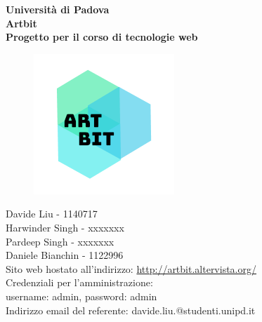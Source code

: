 \documentclass[openany, a4paper, 12pt]{report}
\begin{document}
	\begin{titlepage}
		\centering
		\vfill
		{
			\bfseries
			\vskip2cm
			\Large Università di Padova\\
			\vfill
			\Huge Artbit\\
			\Large Progetto per il corso di tecnologie web\\
			\vfill
			
			\begin{figure}[H]
				\centering
				\includegraphics[width=0.6\linewidth]{logo.png}
			\end{figure}
			\large Davide Liu - 1140717 \\ Harwinder Singh - xxxxxxx \\ Pardeep Singh - xxxxxxx \\ Daniele Bianchin - 1122996 \\
			\vfill
			Sito web hostato all'indirizzo: \url{http://artbit.altervista.org/}\\
			{\small Credenziali per l'amministrazione:\\username: admin, password: admin\\}
			\vfill
			Indirizzo email del referente: davide.liu.@studenti.unipd.it\\
			\vfill
		}
	\end{titlepage}
	\tableofcontents
	\newpage

\end{document}
